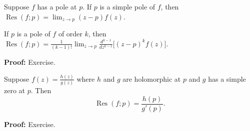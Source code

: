 \documentclass[10pt,aspectratio=169]{beamer}
\begin{document}
\begin{frame}


\begin{proposition}
Suppose $f$ has a pole at $p$.
If $p$ is a simple pole of $f$, then
\quad
$\displaystyle
\operatorname{Res}(f;p) = \lim_{z\to p} (z-p) f(z)$.

\pause
\medskip

If $p$ is a pole of $f$ of order $k$, then
\quad
$\displaystyle
\operatorname{Res}(f;p) = \frac{1}{(k-1)!} \lim_{z\to p}
\frac{d^{k-1}}{dz^{k-1}}\bigl[ (z-p)^{k} f(z) \bigr]$.
\end{proposition}

\pause

\textbf{Proof:} Exercise.

\medskip
\pause

\begin{proposition}
Suppose $f(z) = \frac{h(z)}{g(z)}$ where $h$ and $g$ are holomorphic
at $p$ and $g$ has a simple zero at $p$. %
Then
\begin{equation*}
\operatorname{Res}(f;p) = \frac{h(p)}{g'(p)} .
\end{equation*}
\end{proposition}

\pause

\textbf{Proof:} Exercise.

\end{frame}
\end{document}
